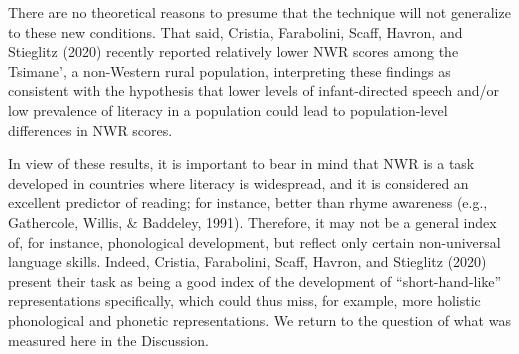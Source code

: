 \documentclass[
  english,
  ,man,floatsintext]{apa6}
\begin{document}
There are no theoretical reasons to presume that the technique will not generalize to these new conditions. That said, Cristia, Farabolini, Scaff, Havron, and Stieglitz (2020) recently reported relatively lower NWR scores among the Tsimane', a non-Western rural population, interpreting these findings as consistent with the hypothesis that lower levels of infant-directed speech and/or low prevalence of literacy in a population could lead to population-level differences in NWR scores.

In view of these results, it is important to bear in mind that NWR is a task developed in countries where literacy is widespread, and it is considered an excellent predictor of reading; for instance, better than rhyme awareness (e.g., Gathercole, Willis, \& Baddeley, 1991). Therefore, it may not be a general index of, for instance, phonological development, but reflect only certain non-universal language skills. Indeed, Cristia, Farabolini, Scaff, Havron, and Stieglitz (2020) present their task as being a good index of the development of ``short-hand-like'' representations specifically, which could thus miss, for example, more holistic phonological and phonetic representations. We return to the question of what was measured here in the Discussion.
\end{document}

